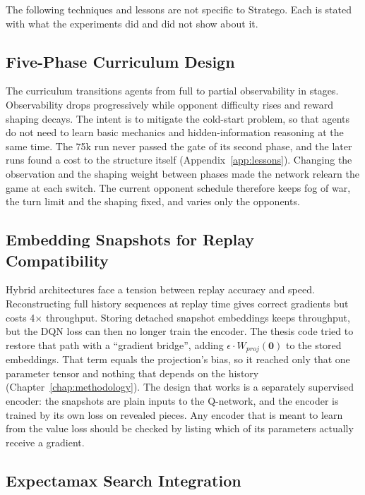 The following techniques and lessons are not specific to Stratego. Each is stated with what the experiments did and did not show about it.

\subsection{Five-Phase Curriculum Design}

The curriculum transitions agents from full to partial observability in stages. Observability drops progressively while opponent difficulty rises and reward shaping decays. The intent is to mitigate the cold-start problem, so that agents do not need to learn basic mechanics and hidden-information reasoning at the same time. The 75k run never passed the gate of its second phase, and the later runs found a cost to the structure itself (Appendix~\ref{app:lessons}). Changing the observation and the shaping weight between phases made the network relearn the game at each switch. The current opponent schedule therefore keeps fog of war, the turn limit and the shaping fixed, and varies only the opponents.

\subsection{Embedding Snapshots for Replay Compatibility}

Hybrid architectures face a tension between replay accuracy and speed. Reconstructing full history sequences at replay time gives correct gradients but costs 4$\times$ throughput. Storing detached snapshot embeddings keeps throughput, but the DQN loss can then no longer train the encoder. The thesis code tried to restore that path with a ``gradient bridge'', adding $\epsilon \cdot W_{proj}(\mathbf{0})$ to the stored embeddings. That term equals the projection's bias, so it reached only that one parameter tensor and nothing that depends on the history (Chapter~\ref{chap:methodology}). The design that works is a separately supervised encoder: the snapshots are plain inputs to the Q-network, and the encoder is trained by its own loss on revealed pieces. Any encoder that is meant to learn from the value loss should be checked by listing which of its parameters actually receive a gradient.

\subsection{Expectamax Search Integration}

